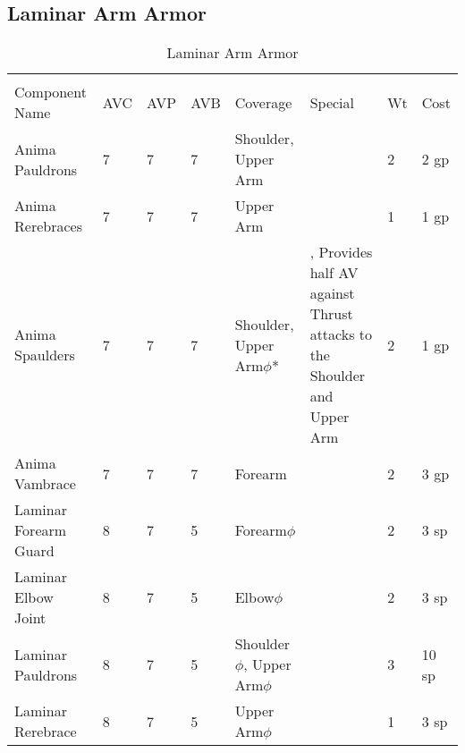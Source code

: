 \documentclass[oneside,11pt,english]{book}
\begin{document}
\subsection{Laminar Arm Armor}
\begin{longtabu} to 
	\captionsetup{textformat=empty, labelformat=blank}
	\caption{Laminar Arm Armor} \vspace{-15pt}
	\label{tab:Laminar Arm Armor}\\
Component Name&AVC&AVP&AVB& Coverage& Special& Wt&Cost\\\toprule
Anima Pauldrons& 7& 7& 7& Shoulder, Upper Arm& & 2& 2 gp\\
Anima Rerebraces& 7& 7& 7& Upper Arm& & 1& 1 gp\\
Anima Spaulders& 7& 7& 7& Shoulder, Upper Arm\hyperref[sec:Weak Spots]{$\phi$}*& , Provides half AV against 
Thrust attacks to the Shoulder and Upper Arm& 2& 1 gp\\
Anima Vambrace& 7& 7& 7& Forearm& & 2& 3 gp\\
Laminar Forearm  Guard& 8& 7& 5& Forearm\hyperref[sec:Weak Spots]{$\phi$}& & 2& 3 sp\\
Laminar Elbow Joint& 8& 7& 5& Elbow\hyperref[sec:Weak Spots]{$\phi$}& & 2& 3 sp\\
Laminar Pauldrons& 8& 7& 5& Shoulder\hyperref[sec:Weak Spots]{$\phi$}, Upper Arm\hyperref[sec:Weak Spots]{$\phi$}& & 3& 10 sp\\
Laminar Rerebrace& 8& 7& 5& Upper Arm\hyperref[sec:Weak Spots]{$\phi$}& & 1& 3 sp\\
\end{longtabu}
\end{document}
